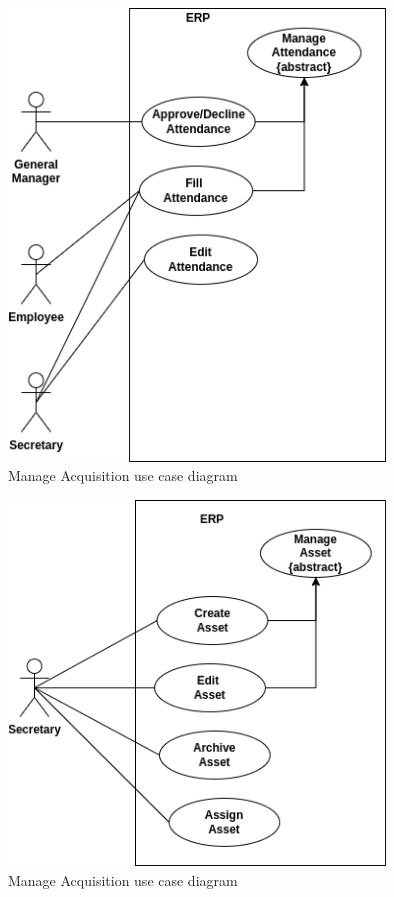\begin{figure}[!ht]
\centering
\includegraphics[width=10cm,keepaspectratio]{usecases/attendance.drawio.png}
\caption{Manage Acquisition use case diagram }
\end{figure}

\begin{figure}[!ht]
\centering
\includegraphics[width=10cm,keepaspectratio]{usecases/asset.drawio.png}
\caption{Manage Acquisition use case diagram }
\end{figure}



